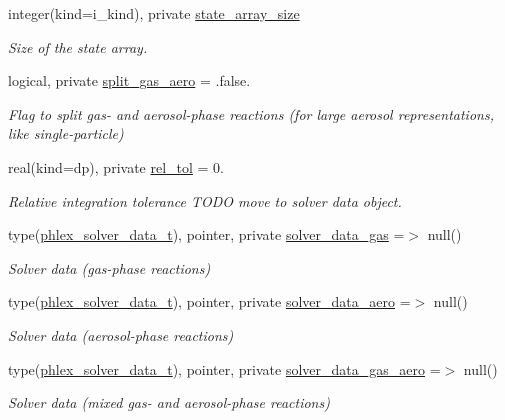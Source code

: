 \begin{DoxyCompactItemize}
integer(kind=i\+\_\+kind), private \mbox{\hyperlink{structpmc__phlex__core_1_1phlex__core__t_aab0f8c2008997598219b67dc450f35f6}{state\+\_\+array\+\_\+size}}
\begin{DoxyCompactList}\small\item\em Size of the state array. \end{DoxyCompactList}\item 
logical, private \mbox{\hyperlink{structpmc__phlex__core_1_1phlex__core__t_a54f534e8247a4e791658745de11535a7}{split\+\_\+gas\+\_\+aero}} = .false.
\begin{DoxyCompactList}\small\item\em Flag to split gas-\/ and aerosol-\/phase reactions (for large aerosol representations, like single-\/particle) \end{DoxyCompactList}\item 
real(kind=dp), private \mbox{\hyperlink{structpmc__phlex__core_1_1phlex__core__t_ad32a01219466ea95cf1db2633f017348}{rel\+\_\+tol}} = 0.
\begin{DoxyCompactList}\small\item\em Relative integration tolerance T\+O\+DO move to solver data object. \end{DoxyCompactList}\item 
type(\mbox{\hyperlink{structpmc__phlex__solver__data_1_1phlex__solver__data__t}{phlex\+\_\+solver\+\_\+data\+\_\+t}}), pointer, private \mbox{\hyperlink{structpmc__phlex__core_1_1phlex__core__t_aa7af562f9e1720a07843e3c39d9a093f}{solver\+\_\+data\+\_\+gas}} =$>$ null()
\begin{DoxyCompactList}\small\item\em Solver data (gas-\/phase reactions) \end{DoxyCompactList}\item 
type(\mbox{\hyperlink{structpmc__phlex__solver__data_1_1phlex__solver__data__t}{phlex\+\_\+solver\+\_\+data\+\_\+t}}), pointer, private \mbox{\hyperlink{structpmc__phlex__core_1_1phlex__core__t_a286ab62eaedfa66082c6817890ecb2f0}{solver\+\_\+data\+\_\+aero}} =$>$ null()
\begin{DoxyCompactList}\small\item\em Solver data (aerosol-\/phase reactions) \end{DoxyCompactList}\item 
type(\mbox{\hyperlink{structpmc__phlex__solver__data_1_1phlex__solver__data__t}{phlex\+\_\+solver\+\_\+data\+\_\+t}}), pointer, private \mbox{\hyperlink{structpmc__phlex__core_1_1phlex__core__t_a686e1dd3503185949c594f0426a7a8a8}{solver\+\_\+data\+\_\+gas\+\_\+aero}} =$>$ null()
\begin{DoxyCompactList}\small\item\em Solver data (mixed gas-\/ and aerosol-\/phase reactions) \end{DoxyCompactList}\end{DoxyCompactItemize}


